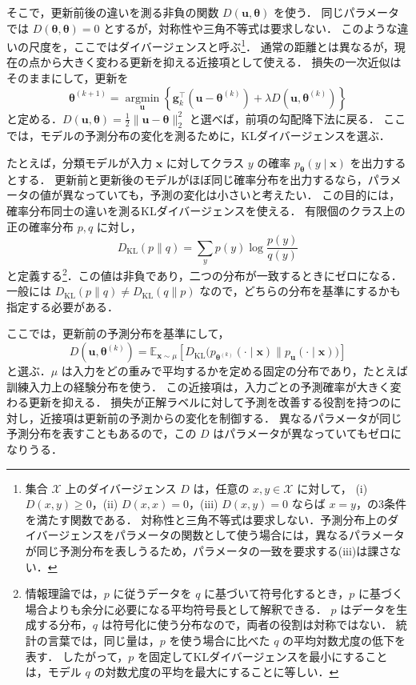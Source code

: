 \documentclass[../main.tex]{subfiles}
\begin{document}
そこで，更新前後の違いを測る非負の関数 $D(\bm{u},\bm{\theta})$ を使う．
同じパラメータでは $D(\bm{\theta},\bm{\theta})=0$ とするが，対称性や三角不等式は要求しない．
このような違いの尺度を，ここではダイバージェンスと呼ぶ\footnote{集合 $\mathcal{X}$ 上のダイバージェンス $D$ は，任意の $x,y\in\mathcal{X}$ に対して，
\textup{(i)} $D(x,y)\geq 0$，\textup{(ii)} $D(x,x)=0$，\textup{(iii)} $D(x,y)=0$ ならば $x=y$，の3条件を満たす関数である．
対称性と三角不等式は要求しない．予測分布上のダイバージェンスをパラメータの関数として使う場合には，異なるパラメータが同じ予測分布を表しうるため，パラメータの一致を要求する\textup{(iii)}は課さない．}．
通常の距離とは異なるが，現在の点から大きく変わる更新を抑える近接項として使える．
損失の一次近似はそのままにして，更新を
\begin{equation}
  \bm{\theta}^{(k+1)}=\underset{\bm{u}}{\operatorname{argmin}}
  \left\{\bm{g}_k^\top(\bm{u}-\bm{\theta}^{(k)})
  +\lambda D(\bm{u},\bm{\theta}^{(k)})\right\}
  \label{eq:md-general-proximity}
\end{equation}
と定める．$D(\bm{u},\bm{\theta})=\tfrac12\|\bm{u}-\bm{\theta}\|_2^2$ と選べば，前項の勾配降下法に戻る．
ここでは，モデルの予測分布の変化を測るために，KLダイバージェンスを選ぶ．

たとえば，分類モデルが入力 $\bm{x}$ に対してクラス $y$ の確率 $p_{\bm{\theta}}(y\mid\bm{x})$ を出力するとする．
更新前と更新後のモデルがほぼ同じ確率分布を出力するなら，パラメータの値が異なっていても，予測の変化は小さいと考えたい．
この目的には，確率分布同士の違いを測るKLダイバージェンスを使える．
有限個のクラス上の正の確率分布 $p,q$ に対し，
\begin{equation}
  D_{\mathrm{KL}}(p\|q)=\sum_y p(y)\log\frac{p(y)}{q(y)}
  \label{eq:md-kl-definition}
\end{equation}
と定義する\footnote{情報理論では，$p$ に従うデータを $q$ に基づいて符号化するとき，$p$ に基づく場合よりも余分に必要になる平均符号長として解釈できる\cite{watanabe2012bayes}．
$p$ はデータを生成する分布，$q$ は符号化に使う分布なので，両者の役割は対称ではない．
統計の言葉では，同じ量は，$p$ を使う場合に比べた $q$ の平均対数尤度の低下を表す．
したがって，$p$ を固定してKLダイバージェンスを最小にすることは，モデル $q$ の対数尤度の平均を最大にすることに等しい\cite{akaike1980entropy}．}．この値は非負であり，二つの分布が一致するときにゼロになる．
一般には $D_{\mathrm{KL}}(p\|q)\ne D_{\mathrm{KL}}(q\|p)$ なので，どちらの分布を基準にするかも指定する必要がある．

ここでは，更新前の予測分布を基準にして，
\begin{equation}
  D(\bm{u},\bm{\theta}^{(k)})
  =\mathbb{E}_{\bm{x}\sim\mu}
  \left[D_{\mathrm{KL}}\bigl(
  p_{\bm{\theta}^{(k)}}(\cdot\mid\bm{x})
  \|p_{\bm{u}}(\cdot\mid\bm{x})\bigr)\right]
  \label{eq:md-predictive-kl}
\end{equation}
と選ぶ．$\mu$ は入力をどの重みで平均するかを定める固定の分布であり，たとえば訓練入力上の経験分布を使う．
この近接項は，入力ごとの予測確率が大きく変わる更新を抑える．
損失が正解ラベルに対して予測を改善する役割を持つのに対し，近接項は更新前の予測からの変化を制御する．
異なるパラメータが同じ予測分布を表すこともあるので，この $D$ はパラメータが異なっていてもゼロになりうる．
\end{document}
